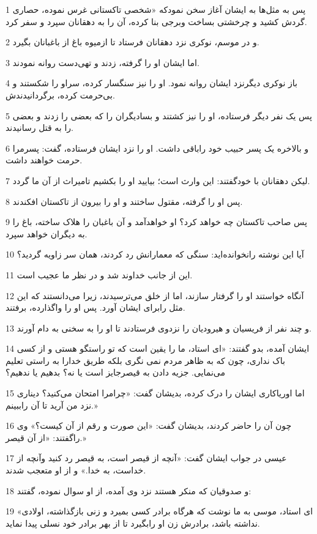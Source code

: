 \par 1 پس به مثل‌ها به ایشان آغاز سخن نمودکه «شخصی تاکستانی غرس نموده، حصاری گردش کشید و چرخشتی بساخت وبرجی بنا کرده، آن را به دهقانان سپرد و سفر کرد.
\par 2 و در موسم، نوکری نزد دهقانان فرستاد تا ازمیوه باغ از باغبانان بگیرد.
\par 3 اما ایشان او را گرفته، زدند و تهی‌دست روانه نمودند.
\par 4 باز نوکری دیگرنزد ایشان روانه نمود. او را نیز سنگسار کرده، سراو را شکستند و بی‌حرمت کرده، برگردانیدندش.
\par 5 پس یک نفر دیگر فرستاده، او را نیز کشتند و بسادیگران را که بعضی را زدند و بعضی را به قتل رسانیدند.
\par 6 و بالاخره یک پسر حبیب خود راباقی داشت. او را نزد ایشان فرستاده، گفت: پسرمرا حرمت خواهند داشت.
\par 7 لیکن دهقانان با خودگفتند: این وارث است؛ بیایید او را بکشیم تامیراث از آن ما گردد.
\par 8 پس او را گرفته، مقتول ساختند و او را بیرون از تاکستان افکندند.
\par 9 پس صاحب تاکستان چه خواهد کرد؟ او خواهدآمد و آن باغبان را هلاک ساخته، باغ را به دیگران خواهد سپرد.
\par 10 آیا این نوشته رانخوانده‌اید: سنگی که معمارانش رد کردند، همان سر زاویه گردید؟
\par 11 این از جانب خداوند شد و در نظر ما عجیب است.
\par 12 آنگاه خواستند او را گرفتار سازند، اما از خلق می‌ترسیدند، زیرا می‌دانستند که این مثل رابرای ایشان آورد. پس او را واگذارده، برفتند.
\par 13 و چند نفر از فریسیان و هیرودیان را نزدوی فرستادند تا او را به سخنی به دام آورند.
\par 14 ایشان آمده، بدو گفتند: «ای استاد، ما را یقین است که تو راستگو هستی و از کسی باک نداری، چون که به ظاهر مردم نمی نگری بلکه طریق خدارا به راستی تعلیم می‌نمایی. جزیه دادن به قیصرجایز است یا نه؟ بدهیم یا ندهیم؟
\par 15 اما اوریاکاری ایشان را درک کرده، بدیشان گفت: «چرامرا امتحان می‌کنید؟ دیناری نزد من آرید تا آن راببینم.»
\par 16 چون آن را حاضر کردند، بدیشان گفت: «این صورت و رقم از آن کیست؟» وی راگفتند: «از آن قیصر.»
\par 17 عیسی در جواب ایشان گفت: «آنچه از قیصر است، به قیصر رد کنید وآنچه از خداست، به خدا.» و از او متعجب شدند.
\par 18 و صدوقیان که منکر هستند نزد وی آمده، از او سوال نموده، گفتند:
\par 19 «ای استاد، موسی به ما نوشت که هرگاه برادر کسی بمیرد و زنی بازگذاشته، اولادی نداشته باشد، برادرش زن او رابگیرد تا از بهر برادر خود نسلی پیدا نماید.
